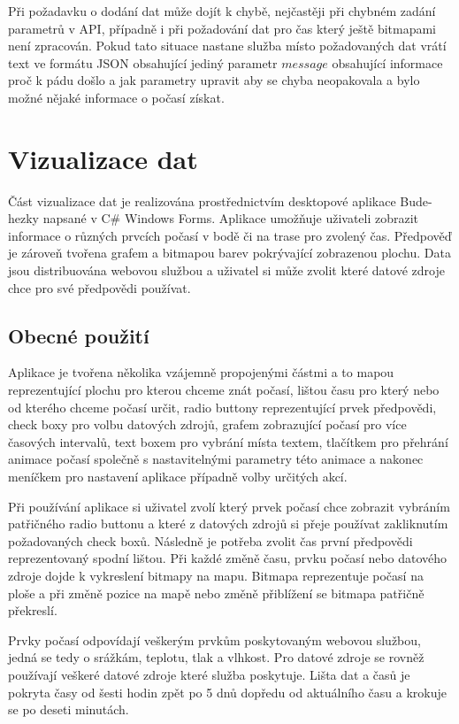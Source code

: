 \documentclass[czech,bachelor,dept460,male,csharp,cpdeclaration]{diploma}
\begin{document}
	Při požadavku o dodání dat může dojít k chybě, nejčastěji při chybném zadání parametrů v API, případně i při požadování dat pro čas který ještě bitmapami není zpracován. Pokud tato situace nastane služba místo požadovaných dat vrátí text ve formátu JSON obsahující jediný parametr $message$ obsahující informace proč k pádu došlo a jak parametry upravit aby se chyba neopakovala a bylo možné nějaké informace o počasí získat.
	
	\chapter{Vizualizace dat}
	
	Část vizualizace dat je realizována prostřednictvím desktopové aplikace Bude-hezky napsané v C\# Windows Forms. Aplikace umožňuje uživateli zobrazit informace o různých prvcích počasí v bodě či na trase pro zvolený čas. Předpověď je zároveň tvořena grafem a bitmapou barev pokrývající zobrazenou plochu. Data jsou distribuována webovou službou a uživatel si může zvolit které datové zdroje chce pro své předpovědi používat.
	
	\section{Obecné použití}
	
	Aplikace je tvořena několika vzájemně propojenými částmi a to mapou reprezentující plochu pro kterou chceme znát počasí, lištou času pro který nebo od kterého chceme počasí určit, radio buttony reprezentující prvek předpovědi, check boxy pro volbu datových zdrojů, grafem zobrazující počasí pro více časových intervalů, text boxem pro vybrání místa textem, tlačítkem pro přehrání animace počasí společně s nastavitelnými parametry této animace a nakonec meníčkem pro nastavení aplikace případně volby určitých akcí.
	
	Při používání aplikace si uživatel zvolí který prvek počasí chce zobrazit vybráním patřičného radio buttonu a které z datových zdrojů si přeje používat zakliknutím požadovaných check boxů. Následně je potřeba zvolit čas první předpovědi reprezentovaný spodní lištou. Při každé změně času, prvku počasí nebo datového zdroje dojde k vykreslení bitmapy na mapu. Bitmapa reprezentuje počasí na ploše a při změně pozice na mapě nebo změně přiblížení se bitmapa patřičně překreslí.
	
	Prvky počasí odpovídají veškerým prvkům poskytovaným webovou službou, jedná se tedy o srážkám, teplotu, tlak a vlhkost. Pro datové zdroje se rovněž používají veškeré datové zdroje které služba poskytuje. Lišta dat a časů 
	je pokryta časy od šesti hodin zpět po 5 dnů dopředu od aktuálního času a krokuje se po deseti minutách.
	
\end{document}
